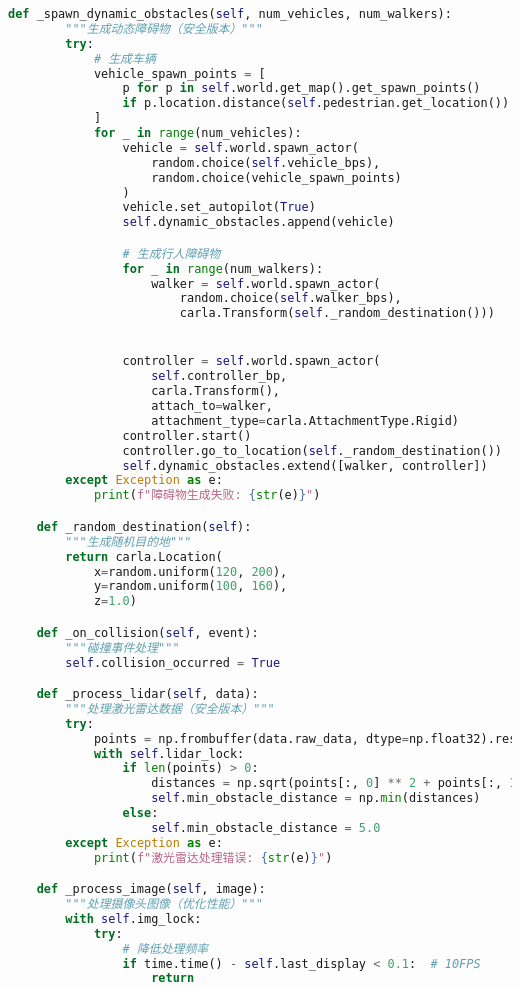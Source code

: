 \begin{lstlisting}[language=Python]
    def _spawn_dynamic_obstacles(self, num_vehicles, num_walkers):
        """生成动态障碍物（安全版本）"""
        try:
            # 生成车辆
            vehicle_spawn_points = [
                p for p in self.world.get_map().get_spawn_points()
                if p.location.distance(self.pedestrian.get_location()) > 20.0
            ]
            for _ in range(num_vehicles):
                vehicle = self.world.spawn_actor(
                    random.choice(self.vehicle_bps),
                    random.choice(vehicle_spawn_points)
                )
                vehicle.set_autopilot(True)
                self.dynamic_obstacles.append(vehicle)

                # 生成行人障碍物
                for _ in range(num_walkers):
                    walker = self.world.spawn_actor(
                        random.choice(self.walker_bps),
                        carla.Transform(self._random_destination()))


                controller = self.world.spawn_actor(
                    self.controller_bp,
                    carla.Transform(),
                    attach_to=walker,
                    attachment_type=carla.AttachmentType.Rigid)
                controller.start()
                controller.go_to_location(self._random_destination())
                self.dynamic_obstacles.extend([walker, controller])
        except Exception as e:
            print(f"障碍物生成失败: {str(e)}")

    def _random_destination(self):
        """生成随机目的地"""
        return carla.Location(
            x=random.uniform(120, 200),
            y=random.uniform(100, 160),
            z=1.0)

    def _on_collision(self, event):
        """碰撞事件处理"""
        self.collision_occurred = True

    def _process_lidar(self, data):
        """处理激光雷达数据（安全版本）"""
        try:
            points = np.frombuffer(data.raw_data, dtype=np.float32).reshape(-1, 4)
            with self.lidar_lock:
                if len(points) > 0:
                    distances = np.sqrt(points[:, 0] ** 2 + points[:, 1] ** 2)
                    self.min_obstacle_distance = np.min(distances)
                else:
                    self.min_obstacle_distance = 5.0
        except Exception as e:
            print(f"激光雷达处理错误: {str(e)}")

    def _process_image(self, image):
        """处理摄像头图像（优化性能）"""
        with self.img_lock:
            try:
                # 降低处理频率
                if time.time() - self.last_display < 0.1:  # 10FPS
                    return


\end{lstlisting}
